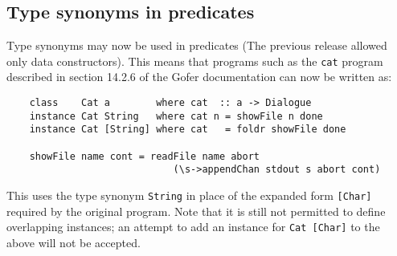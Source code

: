 \subsection{Type synonyms in predicates}
Type synonyms may now be used in predicates (The previous release
allowed only data constructors).  This means that programs such as the
\verb"cat" program described in section 14.2.6  of the Gofer
documentation can now be written as:
\begin{verbatim}
    class    Cat a        where cat  :: a -> Dialogue
    instance Cat String   where cat n = showFile n done
    instance Cat [String] where cat   = foldr showFile done

    showFile name cont = readFile name abort
                             (\s->appendChan stdout s abort cont)
\end{verbatim}
This uses the type synonym \verb"String" in place of the expanded 
form \verb"[Char]"
required by the original program.  Note that it is still not permitted
to define overlapping instances; an attempt to add an instance for 
\verb"Cat [Char]" to the above will not be accepted.


